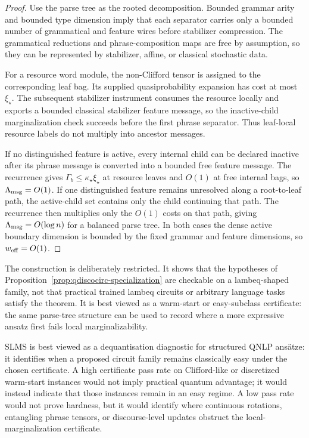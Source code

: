\begin{proof}
Use the parse tree as the rooted decomposition. Bounded grammar arity and bounded type dimension imply that each separator carries only a bounded number of grammatical and feature wires before stabilizer compression. The grammatical reductions and phrase-composition maps are free by assumption, so they can be represented by stabilizer, affine, or classical stochastic data.

For a resource word module, the non-Clifford tensor is assigned to the corresponding leaf bag. Its supplied quasiprobability expansion has cost at most \(\xi_\star\). The subsequent stabilizer instrument consumes the resource locally and exports a bounded classical stabilizer feature message, so the inactive-child marginalization check succeeds before the first phrase separator. Thus leaf-local resource labels do not multiply into ancestor messages.

If no distinguished feature is active, every internal child can be declared inactive after its phrase message is converted into a bounded free feature message. The recurrence gives \(\Gamma_b\le \kappa_\star\xi_\star\) at resource leaves and \(O(1)\) at free internal bags, so \(\Lambda_{\mathrm{msg}}=O(1)\). If one distinguished feature remains unresolved along a root-to-leaf path, the active-child set contains only the child continuing that path. The recurrence then multiplies only the \(O(1)\) costs on that path, giving \(\Lambda_{\mathrm{msg}}=O(\log n)\) for a balanced parse tree. In both cases the dense active boundary dimension is bounded by the fixed grammar and feature dimensions, so \(w_{\mathrm{eff}}=O(1)\).
\end{proof}

The construction is deliberately restricted. It shows that the hypotheses of Proposition~\ref{prop:qdiscocirc-specialization} are checkable on a lambeq-shaped family, not that practical trained lambeq circuits or arbitrary language tasks satisfy the theorem. It is best viewed as a warm-start or easy-subclass certificate: the same parse-tree structure can be used to record where a more expressive ansatz first fails local marginalizability.

SLMS is best viewed as a dequantisation diagnostic for structured QNLP ans\"atze: it identifies when a proposed circuit family remains classically easy under the chosen certificate. A high certificate pass rate on Clifford-like or discretized warm-start instances would not imply practical quantum advantage; it would instead indicate that those instances remain in an easy regime. A low pass rate would not prove hardness, but it would identify where continuous rotations, entangling phrase tensors, or discourse-level updates obstruct the local-marginalization certificate.

